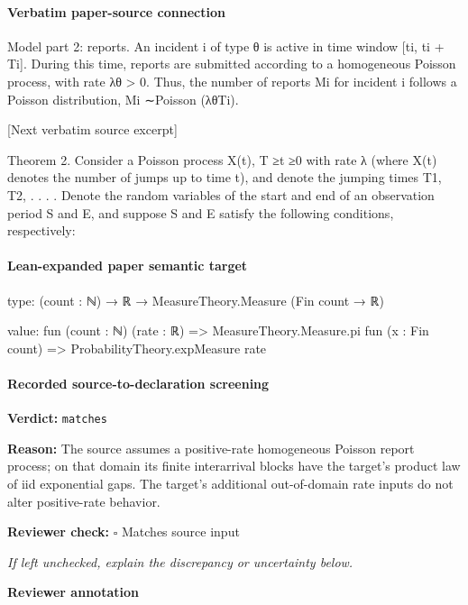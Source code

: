 \documentclass[10pt]{article}
\newcommand{\reviewerbox}{%
  \par\noindent\fbox{\parbox{0.96\linewidth}{\rule{0pt}{0.38in}}}\par
}
\newcommand{\reviewmatch}[1]{%
  \par\noindent\textbf{Reviewer check:} $\square$\; #1\par
  \noindent\emph{If left unchecked, explain the discrepancy or uncertainty below.}\par
}
\begin{document}
\paragraph{Verbatim paper-source connection}
\begin{ReviewVerbatim}
Model part 2: reports. An incident i of type θ is active in time window [ti, ti + Ti]. During this
time, reports are submitted according to a homogeneous Poisson process, with rate λθ > 0. Thus,
the number of reports Mi for incident i follows a Poisson distribution, Mi ∼Poisson (λθTi).

[Next verbatim source excerpt]

Theorem 2. Consider a Poisson process {X(t), T ≥t ≥0} with rate λ (where X(t) denotes the
number of jumps up to time t), and denote the jumping times {T1, T2, . . . }. Denote the random
variables of the start and end of an observation period S and E, and suppose S and E satisfy the
following conditions, respectively:
\end{ReviewVerbatim}



\paragraph{Lean-expanded paper semantic target}
\begin{ReviewVerbatim}
type:
(count : ℕ) → ℝ → MeasureTheory.Measure (Fin count → ℝ)

value:
fun (count : ℕ) (rate : ℝ) => MeasureTheory.Measure.pi fun (x : Fin count) => ProbabilityTheory.expMeasure rate
\end{ReviewVerbatim}


\paragraph{Recorded source-to-declaration screening}
\textbf{Verdict:} \texttt{matches}
\\
{\raggedright
\textbf{Reason:} The source assumes a positive-\allowbreak{}rate homogeneous Poisson report process;\allowbreak{} on that domain its finite interarrival blocks have the target's product law of iid exponential gaps.\allowbreak{} The target's additional out-\allowbreak{}of-\allowbreak{}domain rate inputs do not alter positive-\allowbreak{}rate behavior.\allowbreak{}
\par}
\reviewmatch{Matches source input}
\noindent\textbf{Reviewer annotation}\par
\reviewerbox
\clearpage
\hypertarget{paper-prerequisite-af62fa8c4dfcba44}{}
\end{document}
